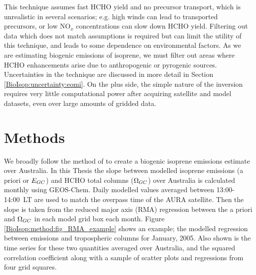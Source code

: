       This technique assumes fast HCHO yield and no precursor transport, which is unrealistic in several scenarios; e.g. high winds can lead to transported precursors, or low NO$_x$ concentrations can slow down HCHO yield.
      Filtering out data which does not match assumptions is required but can limit the utility of this technique, and leads to some dependence on environmental factors.
      As we are estimating biogenic emissions of isoprene, we must filter out areas where HCHO enhancements arise due to anthropogenic or pyrogenic sources.
      Uncertainties in the technique are discussed in more detail in Section \ref{BioIsop:uncertainty:eomi}.
      On the plus side, the simple nature of the inversion requires very little computational power after acquiring satellite and model datasets, even over large amounts of gridded data.
      
\section{Methods}
  \label{BioIsop:method}
  
  
  We broadly follow the method of \textcite{Palmer2001} to create a biogenic isoprene emissions estimate over Australia.
  In this Thesis the slope between modelled isoprene emissions (a priori or $E_{GC}$) and HCHO total columns ($\Omega_{GC}$) over Australia is calculated monthly using GEOS-Chem.
  Daily modelled values averaged between 13:00-14:00~LT are used to match the overpass time of the AURA satellite.
  Then the slope is taken from the reduced major axis (RMA) regression between the a priori and $\Omega_{GC}$ in each model grid box each month.
  Figure \ref{BioIsop:method:fig_RMA_example} shows an example; the modelled regression between emissions and tropospheric columns for January, 2005.
  Also shown is the time series for these two quantities averaged over Australia, and the squared correlation coefficient along with a sample of scatter plots and regressions from four grid squares.
  
  {\label{BioIsop:method:fig_RMA_example}}
  
